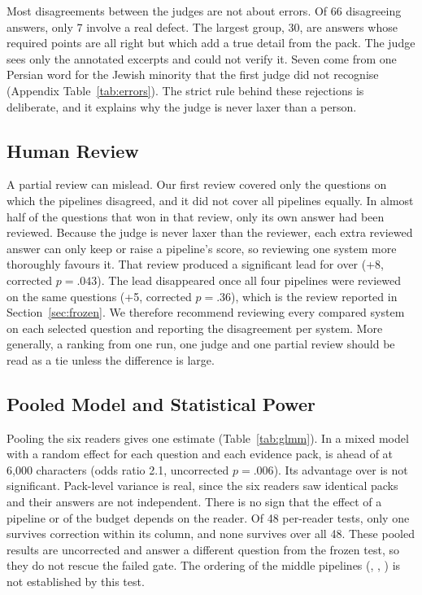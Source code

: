 Most disagreements between the judges are not about errors. Of 66 disagreeing answers, only 7 involve a real defect. The largest group, 30, are answers whose required points are all right but which add a true detail from the pack. The judge sees only the annotated excerpts and could not verify it. Seven come from one Persian word for the Jewish minority that the first judge did not recognise (Appendix Table~\ref{tab:errors}). The strict rule behind these rejections is deliberate, and it explains why the judge is never laxer than a person.

\subsection{Human Review}
A partial review can mislead. Our first review covered only the questions on which the pipelines disagreed, and it did not cover all pipelines equally. In almost half of the questions that \lexb{} won in that review, only its own answer had been reviewed. Because the judge is never laxer than the reviewer, each extra reviewed answer can only keep or raise a pipeline's score, so reviewing one system more thoroughly favours it. That review produced a significant lead for \lexb{} over \hybrid{} (+8, corrected $p=.043$). The lead disappeared once all four pipelines were reviewed on the same questions (+5, corrected $p=.36$), which is the review reported in Section~\ref{sec:frozen}. We therefore recommend reviewing every compared system on each selected question and reporting the disagreement per system. More generally, a ranking from one run, one judge and one partial review should be read as a tie unless the difference is large.

\subsection{Pooled Model and Statistical Power}

Pooling the six readers gives one estimate (Table~\ref{tab:glmm}). In a mixed model with a random effect for each question and each evidence pack, \lexb{} is ahead of \hybrid{} at 6,000 characters (odds ratio 2.1, uncorrected $p=.006$). Its advantage over \hr{} is not significant. Pack-level variance is real, since the six readers saw identical packs and their answers are not independent. There is no sign that the effect of a pipeline or of the budget depends on the reader. Of 48 per-reader tests, only one survives correction within its column, and none survives over all 48. These pooled results are uncorrected and answer a different question from the frozen test, so they do not rescue the failed gate. The ordering of the middle pipelines (\hr, \lexb, \setr) is not established by this test.

